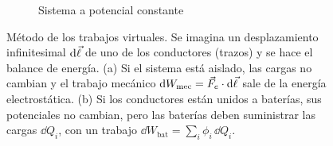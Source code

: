 \begin{figure}[t]
\begin{subfigure}[b]{0.47\textwidth}
\caption{Sistema a potencial constante}
\end{subfigure}
\caption{Método de los trabajos virtuales. Se imagina un desplazamiento infinitesimal $\mathop{}\!\mathrm{d}\vec\ell$ de uno de los conductores
(trazos) y se hace el balance de energía. (a) Si el sistema está aislado, las cargas no cambian y el trabajo mecánico
$\mathop{}\!\mathrm{d} W_{\mathrm{mec}}=\vec F_e\cdot\mathop{}\!\mathrm{d}\vec\ell$ sale de la energía electrostática. (b) Si los conductores están unidos a baterías, sus potenciales
no cambian, pero las baterías deben suministrar las cargas $\dd Q_i$, con un trabajo $\dd W_{\mathrm{bat}}=\sum_i\phi_i\,\dd Q_i$.}
\label{fig:desplazamiento}
\end{figure}
